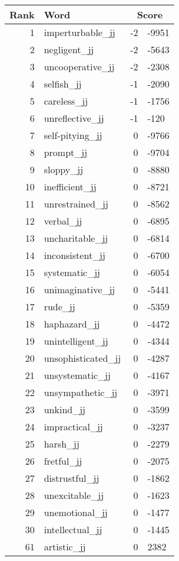 \begin{longtable}[!htbp]{| rlr@{.}l |}
    \hline
    \textbf{Rank} & \textbf{Word} & \multicolumn{2}{c|}{\textbf{Score}} \\
    \hline
    \endhead
    1 & imperturbable\_jj & -2 & -9951 \\
    2 & negligent\_jj & -2 & -5643 \\
    3 & uncooperative\_jj & -2 & -2308 \\
    4 & selfish\_jj & -1 & -2090 \\
    5 & careless\_jj & -1 & -1756 \\
    6 & unreflective\_jj & -1 & -120 \\
    7 & self-pitying\_jj & 0 & -9766 \\
    8 & prompt\_jj & 0 & -9704 \\
    9 & sloppy\_jj & 0 & -8880 \\
    10 & inefficient\_jj & 0 & -8721 \\
    11 & unrestrained\_jj & 0 & -8562 \\
    12 & verbal\_jj & 0 & -6895 \\
    13 & uncharitable\_jj & 0 & -6814 \\
    14 & inconsistent\_jj & 0 & -6700 \\
    15 & systematic\_jj & 0 & -6054 \\
    16 & unimaginative\_jj & 0 & -5441 \\
    17 & rude\_jj & 0 & -5359 \\
    18 & haphazard\_jj & 0 & -4472 \\
    19 & unintelligent\_jj & 0 & -4344 \\
    20 & unsophisticated\_jj & 0 & -4287 \\
    21 & unsystematic\_jj & 0 & -4167 \\
    22 & unsympathetic\_jj & 0 & -3971 \\
    23 & unkind\_jj & 0 & -3599 \\
    24 & impractical\_jj & 0 & -3237 \\
    25 & harsh\_jj & 0 & -2279 \\
    26 & fretful\_jj & 0 & -2075 \\
    27 & distrustful\_jj & 0 & -1862 \\
    28 & unexcitable\_jj & 0 & -1623 \\
    29 & unemotional\_jj & 0 & -1477 \\
    30 & intellectual\_jj & 0 & -1445 \\
    61 & artistic\_jj & 0 & 2382 \\

\end{longtable}
